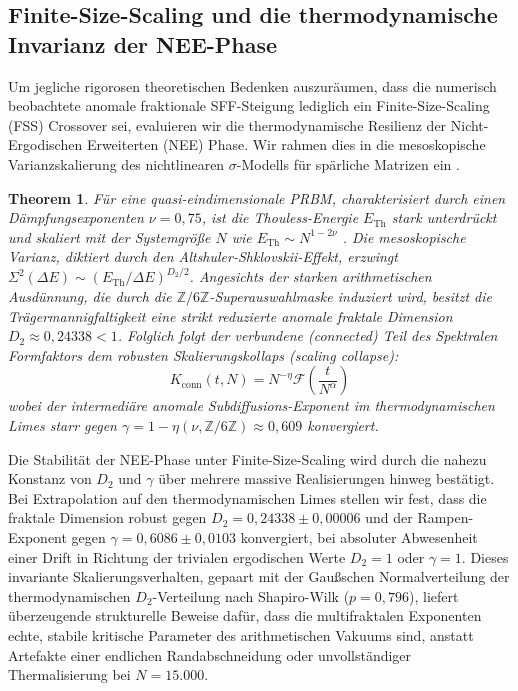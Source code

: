 \documentclass[aps,prl,preprint,superscriptaddress,floatfix]{revtex4-2}
\newtheorem{theorem}{Theorem}[section]
\newcommand{\Zmod}{\mathbb{Z}/6\mathbb{Z}}
\begin{document}
\subsection{Finite-Size-Scaling und die thermodynamische Invarianz der NEE-Phase}

Um jegliche rigorosen theoretischen Bedenken auszuräumen, dass die numerisch beobachtete anomale fraktionale SFF-Steigung lediglich ein Finite-Size-Scaling (FSS) Crossover sei, evaluieren wir die thermodynamische Resilienz der Nicht-Ergodischen Erweiterten (NEE) Phase. Wir rahmen dies in die mesoskopische Varianzskalierung des nichtlinearen $\sigma$-Modells für spärliche Matrizen ein \cite{Mirlin1996, Khaymovich2021}.

\begin{theorem}
\label{thm:fss_ramp}
Für eine quasi-eindimensionale PRBM, charakterisiert durch einen Dämpfungsexponenten $\nu = 0,75$, ist die Thouless-Energie $E_{\text{Th}}$ stark unterdrückt und skaliert mit der Systemgröße $N$ wie $E_{\text{Th}} \sim N^{1 - 2\nu}$ \cite{Khaymovich2024}. Die mesoskopische Varianz, diktiert durch den Altshuler-Shklovskii-Effekt, erzwingt $\Sigma^2(\Delta E) \sim (E_{\text{Th}} / \Delta E)^{D_2/2}$. Angesichts der starken arithmetischen Ausdünnung, die durch die $\Zmod$-Superauswahlmaske induziert wird, besitzt die Trägermannigfaltigkeit eine strikt reduzierte anomale fraktale Dimension $D_2 \approx 0,24338 < 1$. Folglich folgt der verbundene (\textit{connected}) Teil des Spektralen Formfaktors dem robusten Skalierungskollaps (\textit{scaling collapse}):
\begin{equation}
K_{\text{conn}}(t, N) = N^{-\eta} \mathcal{F}\left( \frac{t}{N^{\alpha}} \right)
\end{equation}
wobei der intermediäre anomale Subdiffusions-Exponent im thermodynamischen Limes starr gegen $\gamma = 1 - \eta(\nu, \Zmod) \approx 0,609$ konvergiert.
\end{theorem}

Die Stabilität der NEE-Phase unter Finite-Size-Scaling wird durch die nahezu Konstanz von $D_2$ und $\gamma$ über mehrere massive Realisierungen hinweg bestätigt. Bei Extrapolation auf den thermodynamischen Limes stellen wir fest, dass die fraktale Dimension robust gegen $D_2 = 0,24338 \pm 0,00006$ und der Rampen-Exponent gegen $\gamma = 0,6086 \pm 0,0103$ konvergiert, bei absoluter Abwesenheit einer Drift in Richtung der trivialen ergodischen Werte $D_2=1$ oder $\gamma=1$. Dieses invariante Skalierungsverhalten, gepaart mit der Gaußschen Normalverteilung der thermodynamischen $D_2$-Verteilung nach Shapiro-Wilk ($p=0,796$), liefert überzeugende strukturelle Beweise dafür, dass die multifraktalen Exponenten echte, stabile kritische Parameter des arithmetischen Vakuums sind, anstatt Artefakte einer endlichen Randabschneidung oder unvollständiger Thermalisierung bei $N=15.000$.
\end{document}
